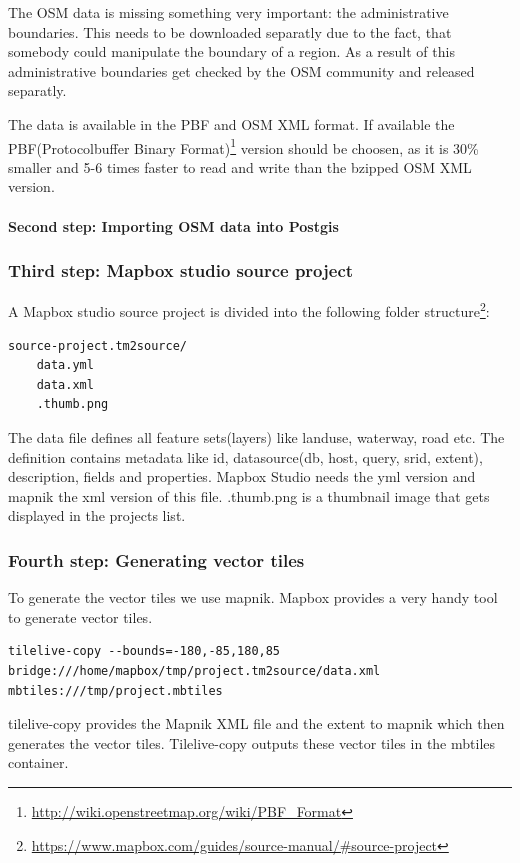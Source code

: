 The OSM data is missing something very important: the administrative
boundaries. This needs to be downloaded separatly due to the fact, that
somebody could manipulate the boundary of a region. As a result of this
administrative boundaries get checked by the OSM community and released
separatly.

The data is available in the PBF and OSM XML format. If available the
PBF(Protocolbuffer Binary
Format)\footnote{\url{http://wiki.openstreetmap.org/wiki/PBF_Format}}
version should be choosen, as it is 30\% smaller and 5-6 times faster to
read and write than the bzipped OSM XML version.

\paragraph{Second step: Importing OSM data into
Postgis}\label{second-step-importing-osm-data-into-postgis}


\subsubsection{Third step: Mapbox studio source
project}\label{third-step-mapbox-studio-source-project}

A Mapbox studio source project is divided into the following folder
structure\footnote{\url{https://www.mapbox.com/guides/source-manual/\#source-project}}:

\begin{verbatim}
source-project.tm2source/
    data.yml
    data.xml
    .thumb.png
\end{verbatim}

The data file defines all feature sets(layers) like landuse, waterway,
road etc. The definition contains metadata like id, datasource(db, host,
query, srid, extent), description, fields and properties. Mapbox Studio
needs the yml version and mapnik the xml version of this file.
.thumb.png is a thumbnail image that gets displayed in the projects
list.

\subsubsection{Fourth step: Generating vector
tiles}\label{fourth-step-generating-vector-tiles}

To generate the vector tiles we use mapnik. Mapbox provides a very handy
tool to generate vector tiles.

\begin{verbatim}
tilelive-copy --bounds=-180,-85,180,85 bridge:///home/mapbox/tmp/project.tm2source/data.xml mbtiles:///tmp/project.mbtiles
\end{verbatim}

tilelive-copy provides the Mapnik XML file and the extent to mapnik
which then generates the vector tiles. Tilelive-copy outputs these
vector tiles in the mbtiles container.
